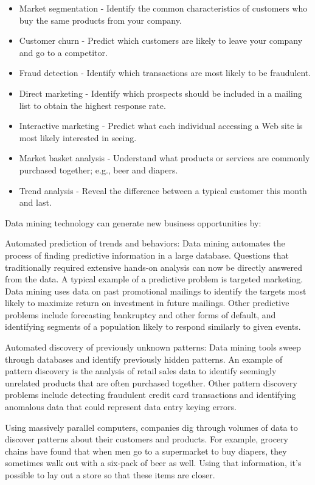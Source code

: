 \begin{itemize}
\item Market segmentation - Identify the common characteristics of customers who buy the same products from your company.
\item Customer churn - Predict which customers are likely to leave your company and go to a competitor.
\item Fraud detection - Identify which transactions are most likely to be fraudulent.
\item Direct marketing - Identify which prospects should be included in a mailing list to obtain the highest response rate.
\item Interactive marketing - Predict what each individual accessing a Web site is most likely interested in seeing.
\item Market basket analysis - Understand what products or services are commonly purchased together; e.g., beer and diapers.
\item Trend analysis - Reveal the difference between a typical customer this month and last.
\end{itemize}
Data mining technology can generate new business opportunities by:

Automated prediction of trends and behaviors: Data mining automates the process of finding predictive information in a large database. Questions that traditionally required extensive hands-on analysis can now be directly answered from the data. A typical example of a predictive problem is targeted marketing. Data mining uses data on past promotional mailings to identify the targets most likely to maximize return on investment in future mailings. Other predictive problems include forecasting bankruptcy and other forms of default, and identifying segments of a population likely to respond similarly to given events.

Automated discovery of previously unknown patterns: Data mining tools sweep through databases and identify previously hidden patterns. An example of pattern discovery is the analysis of retail sales data to identify seemingly unrelated products that are often purchased together. Other pattern discovery problems include detecting fraudulent credit card transactions and identifying anomalous data that could represent data entry keying errors.

Using massively parallel computers, companies dig through volumes of data to discover patterns about their customers and products. For example, grocery chains have found that when men go to a supermarket to buy diapers, they sometimes walk out with a six-pack of beer as well. Using that information, it's possible to lay out a store so that these items are closer.

